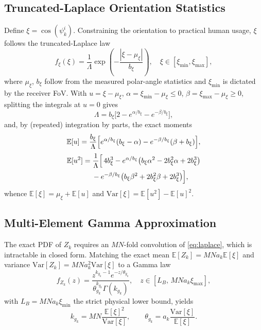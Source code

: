 \documentclass[conference]{IEEEtran}
\newcommand{\E}{\mathbb{E}}
\begin{document}
\subsection{Truncated-Laplace Orientation Statistics}
Define $\xi=\cos(\psi_k^{i})$. Constraining the orientation to practical
human usage, $\xi$ follows the truncated-Laplace law
\begin{equation}
f_{\xi}(\xi) = \frac{1}{\Lambda}\exp\!\left(-\frac{|\xi-\mu_\xi|}{b_\xi}\right),
\quad \xi\in[\xi_{\min},\xi_{\max}],
\label{eq:laplace}
\end{equation}
where $\mu_\xi$, $b_\xi$ follow from the measured polar-angle statistics
\cite{soltani2018} and $\xi_{\min}$ is dictated by the receiver FoV. With
$u=\xi-\mu_\xi$, $\alpha=\xi_{\min}-\mu_\xi\le 0$,
$\beta=\xi_{\max}-\mu_\xi\ge 0$, splitting the integrals at $u=0$ gives
\begin{equation}
\Lambda = b_\xi\bigl[2 - e^{\alpha/b_\xi} - e^{-\beta/b_\xi}\bigr],
\end{equation}
and, by (repeated) integration by parts, the exact moments
\begin{equation}
\E[u] = \frac{b_\xi}{\Lambda}\Bigl[e^{\alpha/b_\xi}(b_\xi-\alpha)
-e^{-\beta/b_\xi}(\beta+b_\xi)\Bigr],
\label{eq:moment1}
\end{equation}
\begin{equation}
\begin{aligned}
\E[u^2] &= \frac{1}{\Lambda}\Bigl[\,4b_\xi^3
- e^{\alpha/b_\xi}\bigl(b_\xi\alpha^2-2b_\xi^2\alpha+2b_\xi^3\bigr)\\
&\quad\; - e^{-\beta/b_\xi}\bigl(b_\xi\beta^2+2b_\xi^2\beta+2b_\xi^3\bigr)
\Bigr],
\end{aligned}
\label{eq:moment2}
\end{equation}
whence $\E[\xi]=\mu_\xi+\E[u]$ and
$\mathrm{Var}[\xi]=\E[u^2]-\E[u]^2$.

\subsection{Multi-Element Gamma Approximation}
The exact PDF of $Z_k$ requires an $MN$-fold convolution of
\eqref{eq:laplace}, which is intractable in closed form. Matching the exact
mean $\E[Z_k]=MNa_k\E[\xi]$ and variance
$\mathrm{Var}[Z_k]=MNa_k^2\mathrm{Var}[\xi]$ to a Gamma law
\begin{equation}
f_{Z_{k}}(z) = \frac{z^{k_{g_k}-1}e^{-z/\theta_{g_k}}}
{\theta_{g_k}^{k_{g_k}}\Gamma(k_{g_k})},
\quad z \in [L_B,\, MNa_k\xi_{\max}],
\label{eq:gamma}
\end{equation}
with $L_B=MNa_k\xi_{\min}$ the strict physical lower bound, yields
\begin{equation}
k_{g_k} = MN\frac{\E[\xi]^2}{\mathrm{Var}[\xi]}, \qquad
\theta_{g_k} = a_k\frac{\mathrm{Var}[\xi]}{\E[\xi]}.
\label{eq:matching}
\end{equation}
\end{document}
